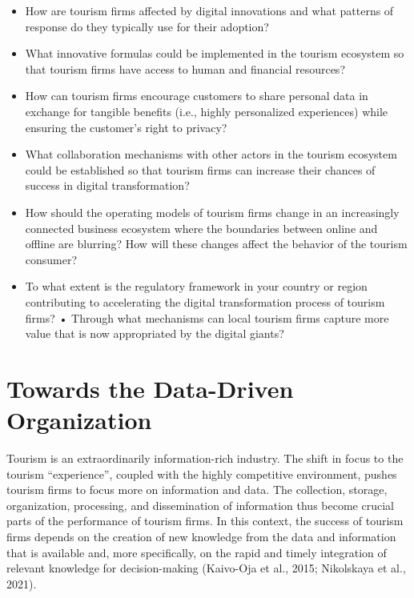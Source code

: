\documentclass[
  letterpaper,
  DIV=11,
  numbers=noendperiod]{scrreprt}
\begin{document}
\begin{itemize}
\item
  How are tourism firms affected by digital innovations and what
  patterns of response do they typically use for their adoption?
\item
  What innovative formulas could be implemented in the tourism ecosystem
  so that tourism firms have access to human and financial resources?
\item
  How can tourism firms encourage customers to share personal data in
  exchange for tangible benefits (i.e., highly personalized experiences)
  while ensuring the customer's right to privacy?
\item
  What collaboration mechanisms with other actors in the tourism
  ecosystem could be established so that tourism firms can increase
  their chances of success in digital transformation?
\item
  How should the operating models of tourism firms change in an
  increasingly connected business ecosystem where the boundaries between
  online and offline are blurring? How will these changes affect the
  behavior of the tourism consumer?
\item
  To what extent is the regulatory framework in your country or region
  contributing to accelerating the digital transformation process of
  tourism firms? • Through what mechanisms can local tourism firms
  capture more value that is now appropriated by the digital giants?
\end{itemize}

\hypertarget{towards-the-data-driven-organization}{%
\chapter{Towards the Data-Driven
Organization}\label{towards-the-data-driven-organization}}

Tourism is an extraordinarily information-rich industry. The shift in
focus to the tourism ``experience'', coupled with the highly competitive
environment, pushes tourism firms to focus more on information and data.
The collection, storage, organization, processing, and dissemination of
information thus become crucial parts of the performance of tourism
firms. In this context, the success of tourism firms depends on the
creation of new knowledge from the data and information that is
available and, more specifically, on the rapid and timely integration of
relevant knowledge for decision-making (Kaivo-Oja et al., 2015;
Nikolskaya et al., 2021).
\end{document}
